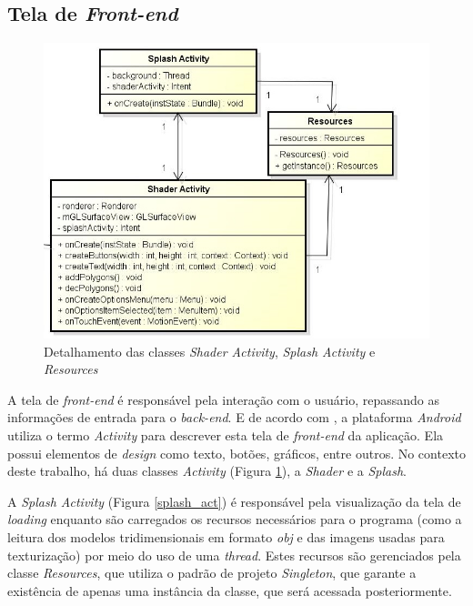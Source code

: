 \subsection{Tela de \textit{Front-end}}

	\begin{figure}[ht]
	\centering
		\includegraphics[keepaspectratio=true,scale=0.6]{figuras/shader_splash.jpg}
	\caption{Detalhamento das classes \textit{Shader Activity}, \textit{Splash Activity} e \textit{Resources}}
	\label{shader_splash}
	\end{figure}

	A tela de \textit{front-end} é responsável pela interação com o usuário, repassando as informações de entrada para o \textit{back-end}. E de acordo com \cite{androidsdkmanager}, a plataforma \textit{Android} utiliza o termo \textit{Activity} para descrever esta tela de \textit{front-end} da aplicação. Ela possui elementos de \textit{design} como texto, botões, gráficos, entre outros. No contexto deste trabalho, há duas classes \textit{Activity} (Figura \ref{shader_splash}), a \textit{Shader} e a \textit{Splash}. 

	A \textit{Splash Activity} (Figura  \ref{splash_act}) é responsável pela visualização da tela de \textit{loading} enquanto são carregados os recursos necessários para o programa (como a leitura dos modelos tridimensionais em formato \textit{obj} e das imagens usadas para texturização) por meio do uso de uma \textit{thread}. Estes recursos são gerenciados pela classe \textit{Resources}, que utiliza o padrão de projeto \textit{Singleton}, que garante a existência de apenas uma instância da classe, que será acessada posteriormente.

